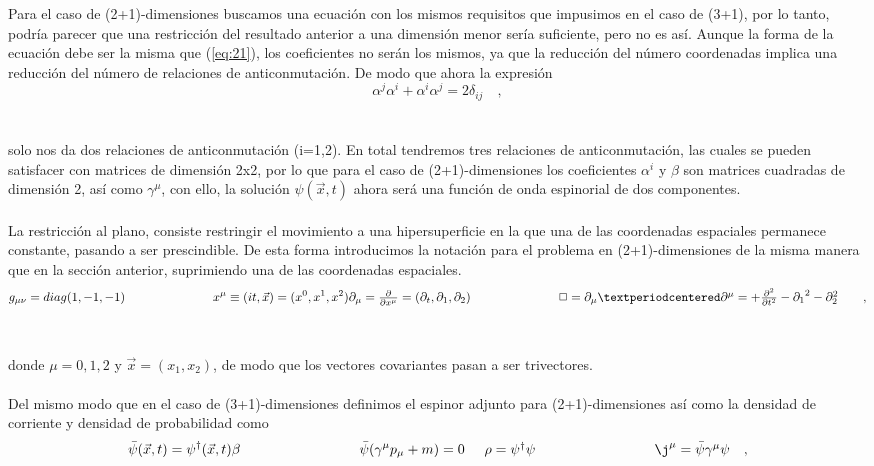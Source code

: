 \documentclass[11pt,letterpaper]{article}     %
\begin{document}
Para el caso de (2+1)-dimensiones buscamos una ecuación con los mismos requisitos que impusimos en el caso de (3+1), por lo tanto, podría parecer que una restricción del resultado anterior a una dimensión menor sería suficiente, pero no es así. Aunque la forma de la ecuación debe ser la misma que (\ref{eq:21}), los coeficientes no serán los mismos, ya que la reducción del número coordenadas implica una reducción del número de relaciones de anticonmutación. De modo que ahora la expresión \\
\begin{equation} \label{eq:115}
\alpha^j  \alpha ^i + \alpha^i  \alpha^j = 2\delta _{ij} \quad ,
\end{equation} \\ \\
solo nos da dos relaciones de anticonmutación (i=1,2). En total tendremos tres relaciones de anticonmutación, las cuales se pueden satisfacer con matrices de dimensión 2x2, por lo que para el caso de (2+1)-dimensiones los coeficientes $\alpha^i$ y $\beta$ son matrices cuadradas de dimensión 2, así como $\gamma^\mu$, con ello, la solución $\psi(\vec{x},t)$ ahora será una función de onda espinorial de dos componentes. \\ \\
La restricción al plano, consiste restringir el movimiento a una hipersuperficie en la que una de las coordenadas espaciales permanece constante, pasando a ser prescindible. De esta forma introducimos la notación para el problema en (2+1)-dimensiones de la misma manera que en la sección anterior, suprimiendo una de las coordenadas espaciales. \\
\begin{equation} \label{eq:116}
g_{\mu \nu}=diag(1,-1,-1) \hspace{2.5cm} x^\mu \equiv (it,\vec{x}) =(x^0,x^1,x^2) $$\\$$
\partial_\mu = \frac{\partial}{\partial x^\mu}=(\partial_t,\partial_1, \partial_2 ) \hspace{2.5cm} \Box = \partial_\mu·\partial^\mu = +\frac{\partial^2}{\partial t^2} - {\partial_1}^2 - {\partial_2^2} \qquad ,
\end{equation} \\ \\
donde $\mu=0,1,2$ y $\vec{x}=(x_1,x_2)$, de modo que los vectores covariantes pasan a ser trivectores. \\ \\
Del mismo modo que en el caso de (3+1)-dimensiones definimos el espinor adjunto para (2+1)-dimensiones así como la densidad de corriente y densidad de probabilidad como \\
\begin{equation} \label{eq:117}
\bar{\psi}(\vec{x},t)= \psi^\dagger (\vec{x},t) \beta \hspace{3cm} \bar{\psi}(\gamma^\mu p_\mu + m)=0 $$\hspace{5mm}$$
\rho=\psi^\dagger\psi \hspace{3cm} \j^\mu=\bar{\psi}\gamma^\mu \psi \quad ,
\end{equation} \\ \\
\end{document}

